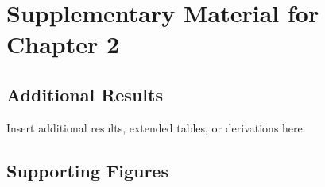 \chapter{Supplementary Material for Chapter 2}
\label{app:chap2}


\section{Additional Results}
Insert additional results, extended tables, or derivations here.

\section{Supporting Figures}
